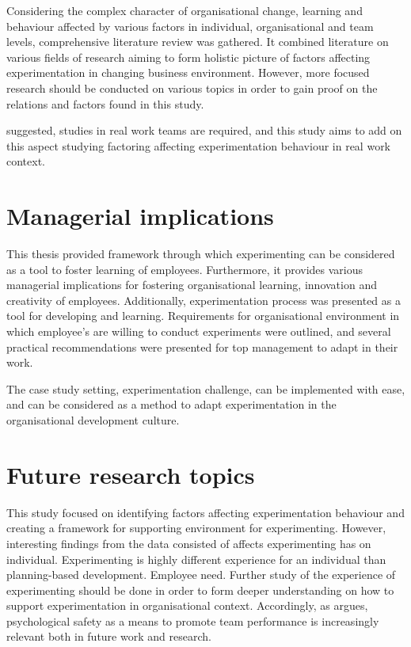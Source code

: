 Considering the complex character of organisational change, learning and behaviour affected by various factors in individual, organisational and team levels, comprehensive literature review was gathered. It combined literature on various fields of research aiming to form holistic picture of factors affecting experimentation in changing business environment. However, more focused research should be conducted on various topics in order to gain proof on the relations and factors found in this study. 

\citet{edmondson1999psychological} suggested, studies in real work teams are required, and this study aims to add on this aspect studying factoring affecting experimentation behaviour in real work context. 

\section{Managerial implications}
This thesis provided framework through which experimenting can be considered as a tool to foster learning of employees. Furthermore, it provides various managerial implications for fostering organisational learning, innovation and creativity of employees. Additionally, experimentation process was presented as a tool for developing and learning. Requirements for organisational environment in which employee's are willing to conduct experiments were outlined, and several practical recommendations were presented for top management to adapt in their work.

The case study setting, experimentation challenge, can be implemented with ease, and can be considered as a method to adapt experimentation in the organisational development culture. 

\section{Future research topics}
This study focused on identifying factors affecting experimentation behaviour and creating a framework for supporting environment for experimenting. However, interesting findings from the data consisted of affects experimenting has on individual. Experimenting is highly different experience for an individual than planning-based development. Employee need. Further study of the experience of experimenting should be done in order to form deeper understanding on how to support experimentation in organisational context. Accordingly, as \citet{edmondson1999psychological} argues, psychological safety as a means to promote team performance is increasingly relevant both in future work and research. 

